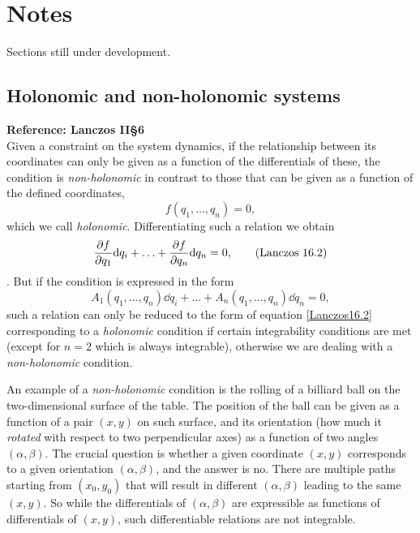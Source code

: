 \documentclass[12pt, english, a4paper]{article}
\begin{document}
\appendix

\section{Notes}
Sections still under development.



\subsection{Holonomic and non-holonomic systems}
\textbf{Reference: Lanczos II\S6}\\

Given a constraint on the system dynamics, if the relationship between its coordinates can only be given as a function of the differentials of these, the condition is \emph{non-holonomic} in contrast to those that can be given as a function of the defined coordinates,
\begin{equation}\label{Lanczos16.1}
	f(q_1,\ldots,q_n) =0,
	\tag{Lanczos 16.1}
\end{equation}
which we call \emph{holonomic}.
Differentiating such a relation we obtain
\begin{equation}\label{Lanczos16.2}
	\pdv{f}{q_1} \dd q_i + \ldots+ \pdv{f}{q_n} \dd q_n = 0,
	\tag{Lanczos 16.2}
\end{equation}.
But if the condition is expressed in the form
\begin{equation}\label{Lanczos16.3}
	A_1(q_1,\ldots,q_n) \dd q_i+\ldots+ A_n(q_1,\ldots,q_n) \dd q_n =0,
	\tag{Lanczos 16.3}
\end{equation}
such a relation can only be reduced to the form of equation \eqref{Lanczos16.2} corresponding to a \emph{holonomic} condition if certain integrability conditions are met (except for \(n=2\) which is always integrable), otherwise we are dealing with a \emph{non-holonomic} condition.

An example of a \emph{non-holonomic} condition is the rolling of a billiard ball on the two-dimensional surface of the table.
The position of the ball can be given as a function of a pair \((x,y)\) on such surface, and its orientation (how much it \emph{rotated} with respect to two perpendicular axes) as a function of two angles \((\alpha, \beta)\).
The crucial question is whether a given coordinate \((x,y)\) corresponds to a given orientation \((\alpha, \beta)\), and the answer is no.
There are multiple paths starting from \((x_0,y_0)\) that will result in different \((\alpha, \beta)\) leading to the same \((x,y)\).
So while the differentials of \((\alpha, \beta)\) are expressible as functions of differentials of \((x,y)\), such differentiable relations are not integrable.
\end{document}
